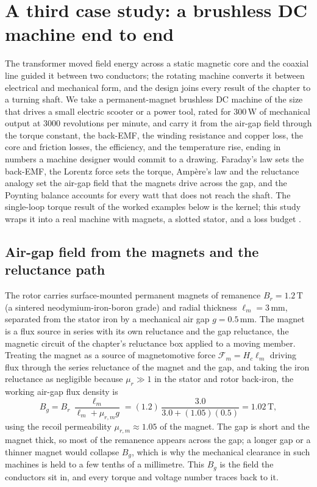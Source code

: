 \section{A third case study: a brushless DC machine end to end}

The transformer moved field energy across a static magnetic core and the
coaxial line guided it between two conductors; the rotating machine
converts it between electrical and mechanical form, and the design joins
every result of the chapter to a turning shaft. We take a permanent-magnet
brushless DC machine of the size that drives a small electric scooter or a
power tool, rated for $300\,\si{\watt}$ of mechanical output at $3000$
revolutions per minute, and carry it from the air-gap field through the
torque constant, the back-EMF, the winding resistance and copper loss, the
core and friction losses, the efficiency, and the temperature rise, ending
in numbers a machine designer would commit to a drawing. Faraday's law
sets the back-EMF, the Lorentz force sets the torque, Amp\`ere's law and
the reluctance analogy set the air-gap field that the magnets drive across
the gap, and the Poynting balance accounts for every watt that does not
reach the shaft. The single-loop torque result of the worked examples
below is the kernel; this study wraps it into a real machine with magnets,
a slotted stator, and a loss budget \cite[ch.~6]{text:griffiths2017}.

\subsection{Air-gap field from the magnets and the reluctance path}

The rotor carries surface-mounted permanent magnets of remanence
$B_r = 1.2\,\si{\tesla}$ (a sintered neodymium-iron-boron grade) and
radial thickness $\ell_m = 3\,\si{\milli\meter}$, separated from the
stator iron by a mechanical air gap $g = 0.5\,\si{\milli\meter}$. The
magnet is a flux source in series with its own reluctance and the gap
reluctance, the magnetic circuit of the chapter's reluctance box applied
to a moving member. Treating the magnet as a source of magnetomotive force
$\mathcal{F}_m = H_c\ell_m$ driving flux through the series reluctance of
the magnet and the gap, and taking the iron reluctance as negligible
because $\mu_r \gg 1$ in the stator and rotor back-iron, the working
air-gap flux density is
\[
B_g = B_r\,\frac{\ell_m}{\ell_m + \mu_{r,m} g} = (1.2)\,\frac{3.0}{3.0 +
(1.05)(0.5)} = 1.02\,\si{\tesla},
\]
using the recoil permeability $\mu_{r,m}\approx 1.05$ of the magnet. The
gap is short and the magnet thick, so most of the remanence appears across
the gap; a longer gap or a thinner magnet would collapse $B_g$, which is
why the mechanical clearance in such machines is held to a few tenths of a
millimetre. This $B_g$ is the field the conductors sit in, and every
torque and voltage number traces back to it.

